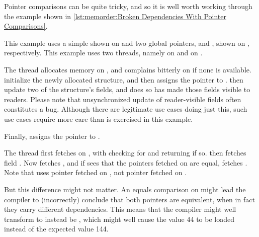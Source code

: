 Pointer comparisons can be quite tricky, and so it is well worth working
through the example shown in
\cref{lst:memorder:Broken Dependencies With Pointer Comparisons}.
\begin{fcvref}
This example uses a simple  shown on 
and two global pointers,  and , shown on ,
respectively.
This example uses two threads, namely  on
 and  on .
\end{fcvref}

\begin{fcvref}
The  thread allocates memory on , and complains
bitterly on  if none is available.
 initialize the newly allocated structure,
and then  assigns the pointer to .
 then update two of the structure's fields, and does
so   has made those fields visible to readers.
Please note that unsynchronized update of reader-visible fields
often constitutes a bug.
Although there are legitimate use cases doing just this, such use cases
require more care than is exercised in this example.

Finally,  assigns the pointer to .
\end{fcvref}

\begin{fcvref}
The  thread first fetches  on , with
 checking for  and returning if so.
 then fetches field .
Now  fetches , and if  sees that the pointers
fetched on  are equal,  fetches .
Note that  uses pointer  fetched on , not
pointer  fetched on .

But this difference might not matter.
An equals comparison on  might lead the compiler to (incorrectly)
conclude that both pointers are equivalent, when in fact they carry
different dependencies.
This means that the compiler might well transform  to instead
be , which might well cause the value 44 to be loaded
instead of the expected value 144.
\end{fcvref}

